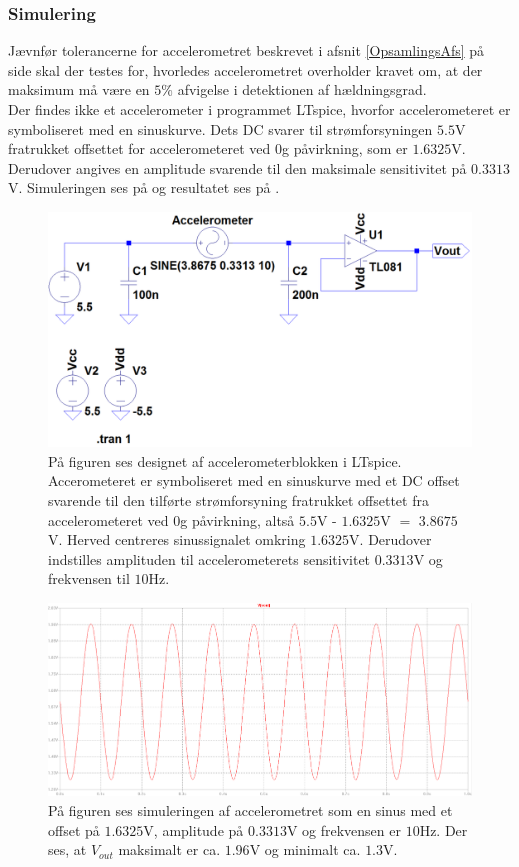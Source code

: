 \subsubsection{Simulering}
Jævnfør tolerancerne for accelerometret beskrevet i afsnit \ref{OpsamlingsAfs} på side \pageref{OpsamlingsAfs} skal der testes for, hvorledes accelerometret overholder kravet om, at der maksimum må være en $5\%$ afvigelse i detektionen af hældningsgrad. \\
Der findes ikke et accelerometer i programmet LTspice, hvorfor accelerometeret er symboliseret med en sinuskurve. Dets DC svarer til strømforsyningen $5.5$V fratrukket offsettet for accelerometeret ved $0$g påvirkning, som er $1.6325$V. Derudover angives en amplitude svarende til den maksimale sensitivitet på $0.3313$V. Simuleringen ses på  og resultatet ses på .
\begin{figure}[H]
	\centering
	\includegraphics[scale=.4]{figures/cProblemloesning/Acc_Simulering1.PNG}
	\caption{På figuren ses designet af accelerometerblokken i LTspice. Accerometeret er symboliseret med en sinuskurve med et DC offset svarende til den tilførte strømforsyning fratrukket offsettet fra accelerometeret ved $0$g påvirkning, altså $5.5$V - $1.6325$V $=$ $3.8675$V. Herved centreres sinussignalet omkring $1.6325$V. Derudover indstilles amplituden til accelerometerets sensitivitet $0.3313$V og frekvensen til $10$Hz.}
	\label{fig:acc_simulering}
\end{figure}
\begin{figure}[H]
	\centering
	\includegraphics[scale=.35]{figures/cProblemloesning/Acc_Simulering2.PNG}
	\caption{På figuren ses simuleringen af accelerometret som en sinus med et offset på $1.6325$V, amplitude på $0.3313$V og frekvensen er $10$Hz. Der ses, at $V_{out}$ maksimalt er ca. $1.96$V og minimalt ca. $1.3$V.}
	\label{fig:acc_simulering_resultat}
\end{figure}

